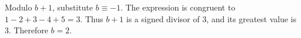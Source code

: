 Modulo $b+1$, substitute $b\equiv-1$. The expression is congruent to $1-2+3-4+5=3$. Thus $b+1$ is a signed divisor of 3, and its greatest value is 3. Therefore $\boxed{b=2}$.
